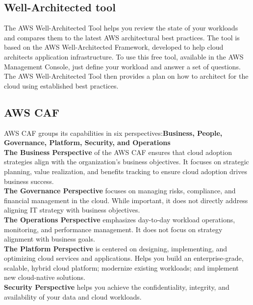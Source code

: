 \documentclass[12pt, letterpaper, twoside]{article}
\begin{document}
\subsection{Well-Architected tool}
The AWS Well-Architected Tool helps you review the state of your workloads and compares them to the latest AWS architectural best 
practices. The tool is based on the AWS Well-Architected Framework, developed to help cloud architects application infrastructure.
To use this free tool, available in the AWS Management Console, just define your workload and answer a set of questions.\\
The AWS Well-Architected Tool then provides a plan on how to architect for the cloud using established best practices.\\

\subsection{AWS CAF}
AWS CAF groups its capabilities in six perspectives:\textbf{Business, People, Governance, Platform, Security, and
Operations}\\

\textbf{The Business Perspective} of the AWS CAF ensures that cloud adoption strategies align with the 
organization's business objectives. It focuses on strategic planning, value realization, and benefits tracking to ensure 
cloud adoption drives business success.\\

\textbf{The Governance Perspective} focuses on managing risks, compliance, and financial management in the 
cloud. While important, it does not directly address aligning IT strategy with business objectives.\\

\textbf{The Operations Perspective} emphasizes day-to-day workload operations, monitoring, and performance 
management. It does not focus on strategy alignment with business goals.\\

\textbf{The Platform Perspective} is centered on designing, implementing, and optimizing cloud services and 
applications. Helps you build an enterprise-grade, scalable, hybrid cloud platform; modernize existing workloads; 
and implement new cloud-native solutions.\\

\textbf{Security Perspective} helps you achieve the confidentiality, integrity, and availability of your data and 
cloud workloads.\\
\end{document}
